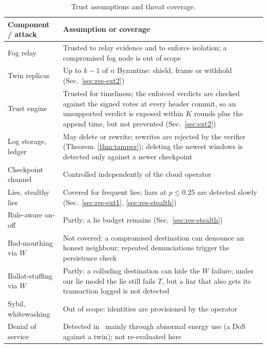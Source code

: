 \begin{table}[!t]
\caption{Trust assumptions and threat coverage.}
\label{tab:threats}
\centering
\renewcommand{\arraystretch}{1.1}
\footnotesize
\setlength{\tabcolsep}{2.5pt}
\begin{tabular}{p{} p{}}
\toprule
\textbf{Component / attack} & \textbf{Assumption or coverage} \\
\midrule
Fog relay & Trusted to relay evidence and to enforce isolation; a compromised fog node is out of scope \\
Twin replicas & Up to $k-1$ of $n$ Byzantine: shield, frame or withhold (Sec.~\ref{sec:res-ext2}) \\
Trust engine & Trusted for timeliness; the enforced verdicts are checked against the signed votes at every header commit, so an unsupported verdict is exposed within $K$ rounds plus the append time, but not prevented (Sec.~\ref{sec:ext2}) \\
Log storage, ledger & May delete or rewrite; rewrites are rejected by the verifier (Theorem~\ref{thm:tamper}); deleting the newest windows is detected only against a newer checkpoint \\
Checkpoint channel & Controlled independently of the cloud operator \\
\midrule
Lies, stealthy lies & Covered for frequent lies; liars at $p\le0.25$ are detected slowly (Sec.~\ref{sec:res-ext1}, \ref{sec:res-stealth}) \\
Rule-aware on-off & Partly: a lie budget remains (Sec.~\ref{sec:res-stealth}) \\
Bad-mouthing via $W$ & Not covered: a compromised destination can denounce an honest neighbour; repeated denunciations trigger the persistence check \\
Ballot-stuffing via $W$ & Partly: a colluding destination can hide the $W$ failure; under our lie model the lie still fails $T$, but a liar that also gets its transaction logged is not detected \\
Sybil, whitewashing & Out of scope: identities are provisioned by the operator~\cite{douceur2002sybil,friedman2001social} \\
Denial of service & Detected in~\cite{soula2024iodt} mainly through abnormal energy use (a DoS against a twin); not re-evaluated here \\
\bottomrule
\end{tabular}
\end{table}

